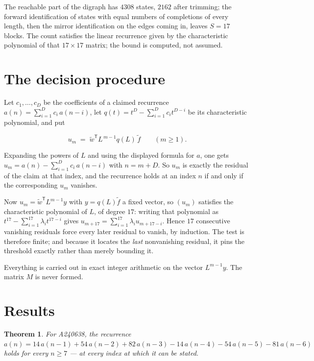 \documentclass[11pt]{article}
\newtheorem{theorem}{Theorem}
\theoremstyle{definition}
\begin{document}
The reachable part of the digraph has $4308$ states, $2162$ after trimming; the forward identification of states with equal numbers of completions of every length, then the mirror identification on the edges coming in, leaves $S = 17$ blocks. The count satisfies the linear recurrence given by the characteristic polynomial of that $17\times17$ matrix; the bound is computed, not assumed.

\section{The decision procedure}

Let $c_1,\dots,c_D$ be the coefficients of a claimed recurrence $a(n) = \sum_{i=1}^{D} c_i\,a(n-i)$, let $q(t) = t^{D} - \sum_{i=1}^{D} c_i t^{D-i}$ be its characteristic polynomial, and put

\[u_m \;=\; \tilde w^{\mathsf T} L^{\,m-1} q(L)\,\tilde f \qquad (m \ge 1).\]

Expanding the powers of $L$ and using the displayed formula for $a$, one gets $u_m = a(n) - \sum_{i=1}^{D} c_i\,a(n-i)$ with $n = m + D$. So $u_m$ is exactly the residual of the claim at that index, and the recurrence holds at an index $n$ if and only if the corresponding $u_m$ vanishes.

Now $u_m = \tilde w^{\mathsf T} L^{m-1} y$ with $y = q(L)\tilde f$ a fixed vector, so $(u_m)$ satisfies the characteristic polynomial of $L$, of degree $17$: writing that polynomial as $t^{17} - \sum_{i=1}^{17} \lambda_i t^{17-i}$ gives $u_{m+17} = \sum_{i=1}^{17} \lambda_i u_{m+17-i}$. Hence $17$ consecutive vanishing residuals force every later residual to vanish, by induction. The test is therefore finite; and because it locates the {\itshape last} nonvanishing residual, it pins the threshold exactly rather than merely bounding it.

Everything is carried out in exact integer arithmetic on the vector $L^{m-1}y$. The matrix $M$ is never formed.

\section{Results}

\begin{theorem} For A240638, the recurrence $a(n) = 14\,a(n-1) + 54\,a(n-2) + 82\,a(n-3) - 14\,a(n-4) - 54\,a(n-5) - 81\,a(n-6)$ holds for every $n \ge 7$ --- at every index at which it can be stated.\end{theorem}
\end{document}
